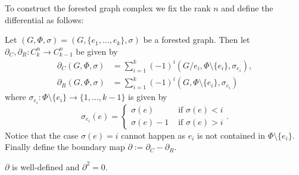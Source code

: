 To construct the forested graph complex we fix the rank $n$ and define the differential as follows:
\begin{definition}
	Let $(G,\Phi,\sigma) = (G, \{e_1,\ldots,e_{k}\},\sigma)$ be a forested graph. Then let $\partial_{C}, \partial_{R}: C_{k}^{n} \to C_{k-1}^{n}$ be given by
	\begin{align*}
		\partial_{C}(G,\Phi,\sigma) &= \sum_{i = 1}^{k} (-1)^{i} (G / e_{i}, \Phi \setminus \{e_{i}\}, \sigma_{e_{i}}),\\
		\partial _{R}(G,\Phi,\sigma) &= \sum_{i = 1}^{k} (-1)^{i} (G,\Phi \setminus \{e_{i}\}, \sigma_{e_{i}}) 
	\end{align*}
	where $\sigma_{e_{i}}: \Phi \setminus \{e_{i}\} \to \{1,\ldots,k-1\}$ is given by
	\[
		\sigma_{e_{i}}(e) = \begin{cases}
			\sigma(e) & \text{ if }\sigma(e) < i\\
			\sigma(e) - 1 & \text{ if } \sigma(e) > i
		\end{cases}
	.\]
	Notice that the case $\sigma(e) = i$ cannot happen as $e_{i}$ is not contained in $\Phi \setminus \{e_{i}\}$. 
	Finally define the boundary map $\partial := \partial_{C} - \partial_{R}$.
\end{definition}

\begin{proposition}
	$\partial$ is well-defined and $\partial^2 = 0$.
\end{proposition}

